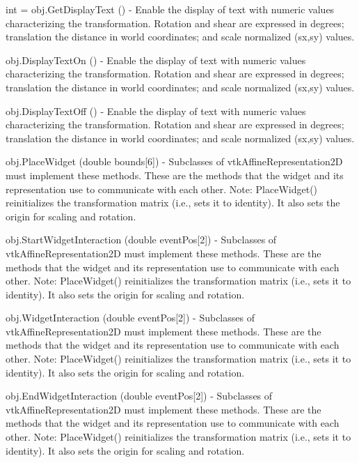 \begin{DoxyItemize}
\item {\ttfamily int = obj.\-Get\-Display\-Text ()} -\/ Enable the display of text with numeric values characterizing the transformation. Rotation and shear are expressed in degrees; translation the distance in world coordinates; and scale normalized (sx,sy) values.  
\item {\ttfamily obj.\-Display\-Text\-On ()} -\/ Enable the display of text with numeric values characterizing the transformation. Rotation and shear are expressed in degrees; translation the distance in world coordinates; and scale normalized (sx,sy) values.  
\item {\ttfamily obj.\-Display\-Text\-Off ()} -\/ Enable the display of text with numeric values characterizing the transformation. Rotation and shear are expressed in degrees; translation the distance in world coordinates; and scale normalized (sx,sy) values.  
\item {\ttfamily obj.\-Place\-Widget (double bounds\mbox{[}6\mbox{]})} -\/ Subclasses of vtk\-Affine\-Representation2\-D must implement these methods. These are the methods that the widget and its representation use to communicate with each other. Note\-: Place\-Widget() reinitializes the transformation matrix (i.\-e., sets it to identity). It also sets the origin for scaling and rotation.  
\item {\ttfamily obj.\-Start\-Widget\-Interaction (double event\-Pos\mbox{[}2\mbox{]})} -\/ Subclasses of vtk\-Affine\-Representation2\-D must implement these methods. These are the methods that the widget and its representation use to communicate with each other. Note\-: Place\-Widget() reinitializes the transformation matrix (i.\-e., sets it to identity). It also sets the origin for scaling and rotation.  
\item {\ttfamily obj.\-Widget\-Interaction (double event\-Pos\mbox{[}2\mbox{]})} -\/ Subclasses of vtk\-Affine\-Representation2\-D must implement these methods. These are the methods that the widget and its representation use to communicate with each other. Note\-: Place\-Widget() reinitializes the transformation matrix (i.\-e., sets it to identity). It also sets the origin for scaling and rotation.  
\item {\ttfamily obj.\-End\-Widget\-Interaction (double event\-Pos\mbox{[}2\mbox{]})} -\/ Subclasses of vtk\-Affine\-Representation2\-D must implement these methods. These are the methods that the widget and its representation use to communicate with each other. Note\-: Place\-Widget() reinitializes the transformation matrix (i.\-e., sets it to identity). It also sets the origin for scaling and rotation.  

\end{DoxyItemize}

